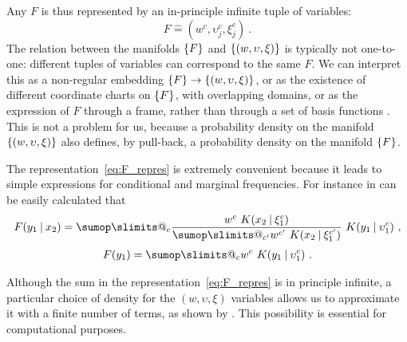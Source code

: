 \documentclass[\ifafour a4paper,12pt,\else a5paper,10pt,\fi%
onecolumn,oneside,article,%
british%
]{memoir}
\makeatletter
\theoremstyle{remark}
\theoremstyle{innote}
\def\sum{\DOTSI\sumop\slimits@}
\newcommand*{\di}{\mathrm{d}}%
\newcommand*{\defd}{\coloneqq}
\newcommand*{\corr}{\mathrel{\hat{=}}}%
\DeclarePairedDelimiter\set{\{}{\}} %
\newcommand*{\p}{\mathrm{p}}%
\renewcommand*{\|}[1][]{\nonscript\:#1\vert\nonscript\:\mathopen{}}
\newcommand*{\chap}{ch.}%
\newcommand*{\eqn}{eq.}%
\makeatother
\begin{document}
Any $F$ is thus represented by an in-principle infinite tuple of variables:
\begin{equation}
  \label{eq:F_coords}
  F \corr (w^{c}, \upsilon^{c}_{j}, \xi^{c}_{j}) \ .
\end{equation}
The relation between the manifolds $\set{F}$ and $\set{(w, \upsilon, \xi)}$ is typically not one-to-one: different tuples of variables can correspond to the same $F$. We can interpret this as a non-regular embedding $\set{F} \to \set{(w, \upsilon, \xi)}$, or as the existence of different coordinate charts on $\set{F}$, with overlapping domains, or as the expression of $F$ through a frame, rather than through a set of basis functions \autocites{balanetal2006}[\chap~8]{heil1998_r2011}[\chap~3]{daubechies1992_r1999}. This is not a problem for us, because a probability density on the manifold $\set{(w, \upsilon, \xi)}$ also defines, by pull-back, a probability density on the manifold $\set{F}$.

The representation~\eqref{eq:F_repres} is extremely convenient because it leads to simple expressions for conditional and marginal frequencies. For instance in can be easily calculated that
\begin{gather}
  \label{eq:Fconditional_example}
  F(y_{1} \| x_{2}) =
  \sum_{c}
  \frac{ w^{c}\ K(x_{2} \| \xi^{c}_{1})}{
   \sum_{c'} w^{c'}\ K(x_{2} \| \xi^{c'}_{1})
}\ 
  K(y_{1} \| \upsilon^{c}_{1}) \ ,
\\[\jot]
  F(y_{1}) =
  \sum_{c} w^{c}\ K(y_{1} \| \upsilon^{c}_{1}) \ .
\end{gather}

Although the sum in the representation~\eqref{eq:F_repres} is in principle infinite, a particular choice of density for the $(w,\upsilon,\xi)$ variables allows us to approximate it with a finite number of terms, as shown by \textcites{ishwaranetal2002b}. This possibility is essential for computational purposes.


\end{document}
